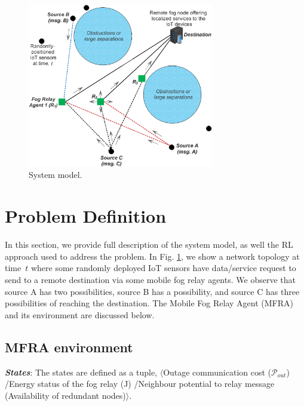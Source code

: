 \documentclass[journal]{IEEEtran}
\begin{document}
\begin{figure}[!t]
\centering
\includegraphics[width=3.2in]{ideafig1.eps}
\caption{System model.}
\label{ideafig1}
\end{figure}

\section{Problem Definition}
In this section, we provide full description of the system model, as well the RL approach used to address the problem. In Fig. \ref{ideafig1}, we show a network topology at time~$t$ where some randomly deployed IoT sensors have data/service request to send to a remote destination via some mobile fog relay agents. We observe that source A has two possibilities, source B has a possibility, and source C has three possibilities of reaching the destination.
The Mobile Fog Relay Agent (MFRA) and its environment are discussed below.

\subsection{MFRA environment}
\emph{\textbf{States}}: The states are defined as a tuple, $\langle$Outage communication cost ($\mathcal{P}_{out}$) /Energy status of the fog relay (J) /Neighbour potential to relay message (Availability of redundant nodes)$\rangle$.
\end{document}
